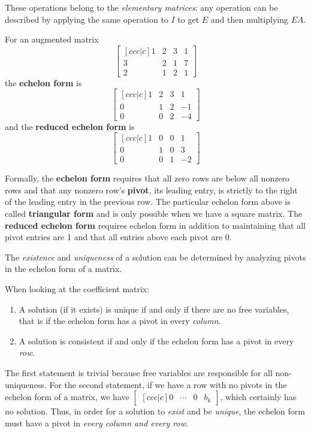 These operations belong to the \textit{elementary matrices}: any operation can be described by applying the same operation to $I$ to get $E$ and then multiplying $EA$.

\begin{definition}
For an augmented matrix 
$$\begin{bmatrix}[ccc|c]
1 & 2 & 3 & 1 \\
3 & 2 & 1 & 7 \\
2 & 1 & 2 & 1
\end{bmatrix}$$
the \textbf{echelon form} is 
$$\begin{bmatrix}[ccc|c]
1 & 2 & 3 & 1 \\
0 & 1 & 2 & -1 \\
0 & 0 & 2 & -4
\end{bmatrix}$$
and the \textbf{reduced echelon form} is 
$$\begin{bmatrix}[ccc|c]
1 & 0 & 0 & 1 \\
0 & 1 & 0 & 3 \\
0 & 0 & 1 & -2
\end{bmatrix}$$

Formally, the \textbf{echelon form} requires that all zero rows are below all nonzero rows and that any nonzero row's \textbf{pivot}, its leading entry, is strictly to the right of the leading entry in the previous row. The particular echelon form above is called \textbf{triangular form} and is only possible when we have a square matrix. The \textbf{reduced echelon form} requires echelon form in addition to maintaining that all pivot entries are 1 and that all entries above each pivot are 0. 
\end{definition}

The \textit{existence} and \textit{uniqueness} of a solution can be determined by analyzing pivots in the echelon form of a matrix. 

When looking at the coefficient matrix: 
\begin{enumerate}
	\item A solution (if it exists) is unique if and only if there are no free variables, that is if the echelon form has a pivot in every \textit{column}. 
	\item A solution is consistent if and only if the echelon form has a pivot in every \textit{row}. 
\end{enumerate}
The first statement is trivial because free variables are responsible for all non-uniqueness. For the second statement, if we have a row with no pivots in the echelon form of a matrix, we have $\begin{bmatrix}[ccc|c]
0 & \cdots & 0 & b_{k}
\end{bmatrix}$, which certainly has no solution. Thus, in order for a solution to \textit{exist} and be \textit{unique}, the echelon form must have a pivot in \textit{every column and every row}. 

